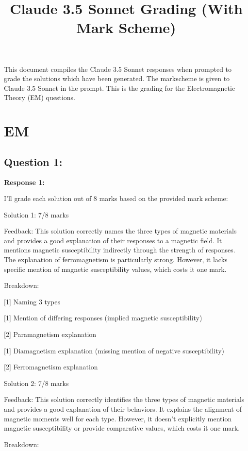 \documentclass[a4paper,11pt]{article}
\begin{document}
\title{Claude 3.5 Sonnet Grading (With Mark Scheme)}
\maketitle

This document compiles the Claude 3.5 Sonnet responses when prompted to grade the solutions which have been generated. The markscheme is given to Claude 3.5 Sonnet in the prompt. This is the grading for the Electromagnetic Theory (EM) questions. 

\section{EM}

\subsection*{Question 1:}

\textbf{Response 1:}

I'll grade each solution out of 8 marks based on the provided mark scheme:

Solution 1: 7/8 marks

Feedback: This solution correctly names the three types of magnetic materials and provides a good explanation of their responses to a magnetic field. It mentions magnetic susceptibility indirectly through the strength of responses. The explanation of ferromagnetism is particularly strong. However, it lacks specific mention of magnetic susceptibility values, which costs it one mark.

Breakdown:

[1] Naming 3 types

[1] Mention of differing responses (implied magnetic susceptibility)

[2] Paramagnetism explanation

[1] Diamagnetism explanation (missing mention of negative susceptibility)

[2] Ferromagnetism explanation

Solution 2: 7/8 marks

Feedback: This solution correctly identifies the three types of magnetic materials and provides a good explanation of their behaviors. It explains the alignment of magnetic moments well for each type. However, it doesn't explicitly mention magnetic susceptibility or provide comparative values, which costs it one mark.

Breakdown:
\end{document}
